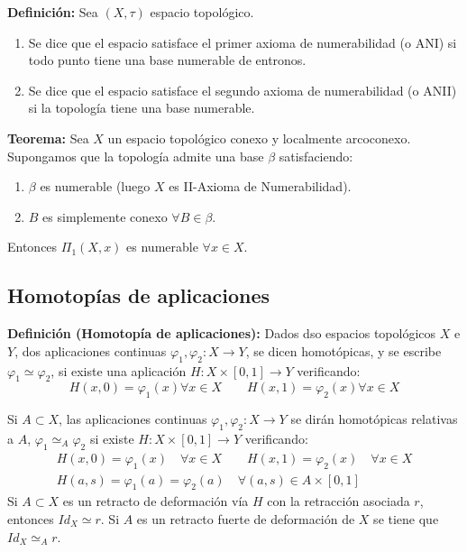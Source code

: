 \documentclass{article}
\begin{document}
\textbf{Definición:} Sea $(X,\tau)$ espacio topológico.
\begin{enumerate}
\item Se dice que el espacio satisface el primer axioma de numerabilidad (o ANI) si todo punto tiene una base numerable de entronos.

\item Se dice que el espacio satisface el segundo axioma de numerabilidad (o ANII) si la topología tiene una base numerable.
\end{enumerate}

\textbf{Teorema:} Sea $X$ un espacio topológico conexo y localmente arcoconexo. Supongamos que la topología admite una base $\beta$ satisfaciendo:
\begin{enumerate}
\item $\beta$ es numerable (luego $X$ es II-Axioma de Numerabilidad).

\item $B$ es simplemente conexo $\forall B\in \beta$.
\end{enumerate}
Entonces $\Pi_1(X,x)$ es numerable $\forall x\in X$. \\

\subsection{Homotopías de aplicaciones}
\textbf{Definición (Homotopía de aplicaciones):} Dados dso espacios topológicos $X$ e $Y$, dos aplicaciones continuas $\varphi_1,\varphi_2:X\rightarrow Y$, se dicen homotópicas, y se escribe $\varphi_1\simeq \varphi_2$, si existe una aplicación $H:X\times [0,1]\rightarrow Y$ verificando:
\begin{equation*}
H(x,0)=\varphi_1(x)\forall x\in X\qquad H(x,1)=\varphi_2(x)\forall x\in X
\end{equation*}

Si $A\subset X$, las aplicaciones continuas $\varphi_1,\varphi_2:X\rightarrow Y$ se dirán homotópicas relativas a $A$, $\varphi_1\simeq_A\varphi_2$ si existe $H:X\times [0,1]\rightarrow Y$ verificando:
\begin{gather*}
H(x,0)=\varphi_1(x)\quad \forall x\in X\qquad H(x,1)=\varphi_2(x)\quad \forall x\in X\\
H(a,s)=\varphi_1(a)=\varphi_2(a)\quad \forall(a,s)\in A\times [0,1]
\end{gather*}
Si $A\subset X$ es un retracto de deformación vía $H$ con la retracción asociada $r$, entonces $Id_X\simeq r$. Si $A$ es un retracto fuerte de deformación de $X$ se tiene que $Id_X\simeq_A r$.\\
\end{document}
